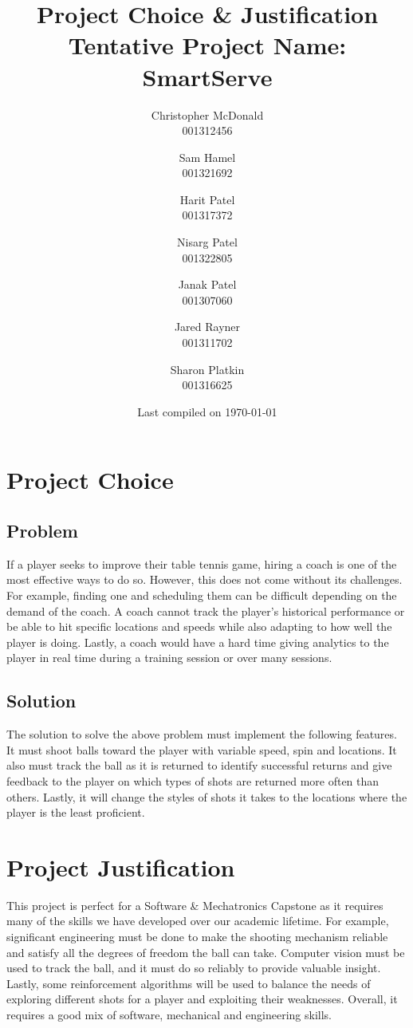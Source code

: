 \documentclass[11pt, oneside]{article}
\title{Project Choice \& Justification \\ Tentative Project Name: SmartServe}
\author{
Christopher McDonald \\ 001312456 \\ \and
Sam Hamel \\ 001321692 \\ \and
Harit Patel \\ 001317372 \\ \and
Nisarg Patel \\ 001322805 \\ \and
Janak Patel \\ 001307060 \\ \and
Jared Rayner \\ 001311702 \\ \and
Sharon Platkin \\ 001316625 \\
}
\date{Last compiled on \today}
\begin{document}
\maketitle
\section*{Project Choice}
\subsection*{Problem}
If a player seeks to improve their table tennis game, hiring a coach is one of the most effective ways to do so. However, this does not come without its challenges. For example, finding one and scheduling them can be difficult depending on the demand of the coach. A coach cannot track the player's historical performance or be able to hit specific locations and speeds while also adapting to how well the player is doing. Lastly, a coach would have a hard time giving analytics to the player in real time during a training session or over many sessions.
\subsection*{Solution}
The solution to solve the above problem must implement the following features. It must shoot balls toward the player with variable speed, spin and locations. It also must track the ball as it is returned to identify successful returns and give feedback to the player on which types of shots are returned more often than others. Lastly, it will change the styles of shots it takes to the locations where the player is the least proficient.
\section*{Project Justification}
This project is perfect for a Software \& Mechatronics Capstone as it requires many of the skills we have developed over our academic lifetime. For example, significant engineering must be done to make the shooting mechanism reliable and satisfy all the degrees of freedom the ball can take. Computer vision must be used to track the ball, and it must do so reliably to provide valuable insight. Lastly, some reinforcement algorithms will be used to balance the needs of exploring different shots for a player and exploiting their weaknesses. Overall, it requires a good mix of software, mechanical and engineering skills.
\end{document}

